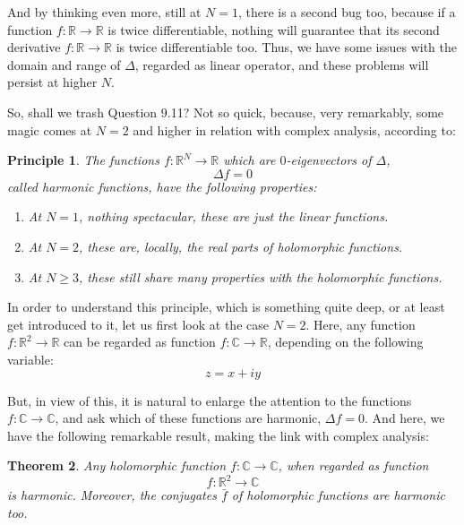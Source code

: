 \documentclass[12pt]{amsbook}
\newtheorem{theorem}{Theorem}[chapter]
\newtheorem{principle}[theorem]{Principle}
\begin{document}
\bigskip

And by thinking even more, still at $N=1$, there is a second bug too, because if a function $f:\mathbb R\to\mathbb R$ is twice differentiable, nothing will guarantee that its second derivative $f:\mathbb R\to\mathbb R$ is twice differentiable too. Thus, we have some issues with the domain and range of $\Delta$, regarded as linear operator, and these problems will persist at higher $N$.

\bigskip

So, shall we trash Question 9.11? Not so quick, because, very remarkably, some magic comes at $N=2$ and higher in relation with complex analysis, according to:

\begin{principle}
The functions $f:\mathbb R^N\to\mathbb R$ which are $0$-eigenvectors of $\Delta$,
$$\Delta f=0$$
called harmonic functions, have the following properties:
\begin{enumerate}
\item At $N=1$, nothing spectacular, these are just the linear functions.

\item At $N=2$, these are, locally, the real parts of holomorphic functions.

\item At $N\geq 3$, these still share many properties with the holomorphic functions. 
\end{enumerate}
\end{principle}

In order to understand this principle, which is something quite deep, or at least get introduced to it, let us first look at the case $N=2$. Here, any function $f:\mathbb R^2\to\mathbb R$ can be regarded as function $f:\mathbb C\to\mathbb R$, depending on the following variable:
$$z=x+iy$$

But, in view of this, it is natural to enlarge the attention to the functions $f:\mathbb C\to\mathbb C$, and ask which of these functions are harmonic, $\Delta f=0$. And here, we have the following remarkable result, making the link with complex analysis:

\begin{theorem}
Any holomorphic function $f:\mathbb C\to\mathbb C$, when regarded as function
$$f:\mathbb R^2\to\mathbb C$$
is harmonic. Moreover, the conjugates $\bar{f}$ of holomorphic functions are harmonic too.
\end{theorem}
\end{document}
